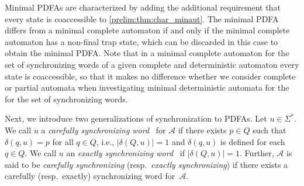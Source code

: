 Minimal PDFAs are characterized by adding the additional requirement that every state is coaccessible
to \cref{prelim:thm:char_minaut}.
The minimal PDFA differs from a minimal complete
automaton if and only if the minimal complete automaton has a non-final trap state,
which can be discarded in this case to obtain the minimal PDFA. 
Note that in a minimal complete automaton for the set of synchronizing words of a given complete and deterministic automaton
every state is coaccessible, so that  it makes no difference 
whether we consider complete or partial automata when investigating minimal deterministic automata for the 
for the set of synchronizing words.

Next, we introduce two generalizations of synchronization to PDFAs.
Let $u \in \Sigma^*$.
We call $u$ a \emph{carefully synchronizing word}~\cite{Martyugin14,Rystsov1980} for $\mathcal A$
if there exists $p \in Q$ such that $\delta(q, u) = p$
for all $q \in Q$, i.e., $|\delta(Q, u)| = 1$ and $\delta(q, u)$ is defined
for each $q \in Q$.
We call $u$ an \emph{exactly synchronizing word}~\cite{Shabana_2019,TraverCrutchfield2011}
if $|\delta(Q, u)| = 1$.
Further, $\mathcal A$ is said to be \emph{carefully synchronizing} (resp.~\emph{exactly synchronizing})
if there exists a carefully (resp.~exactly) synchronizing word for~$\mathcal A$.